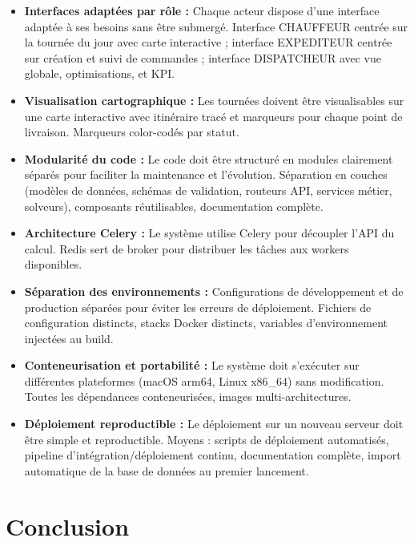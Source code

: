 \documentclass[12pt,a4paper]{report}
\begin{document}
\begin{itemize}[leftmargin=2.2em]
    \item \textbf{Interfaces adaptées par rôle :} Chaque acteur dispose d'une interface adaptée à ses besoins sans être submergé. Interface CHAUFFEUR centrée sur la tournée du jour avec carte interactive ; interface EXPEDITEUR centrée sur création et suivi de commandes ; interface DISPATCHEUR avec vue globale, optimisations, et KPI.

    \item \textbf{Visualisation cartographique :} Les tournées doivent être visualisables sur une carte interactive avec itinéraire tracé et marqueurs pour chaque point de livraison. Marqueurs color-codés par statut.

    \item \textbf{Modularité du code :} Le code doit être structuré en modules clairement séparés pour faciliter la maintenance et l'évolution. Séparation en couches (modèles de données, schémas de validation, routeurs API, services métier, solveurs), composants réutilisables, documentation complète.

    \item \textbf{Architecture Celery :} Le système utilise Celery pour découpler l'API du calcul. Redis sert de broker pour distribuer les tâches aux workers disponibles.

    \item \textbf{Séparation des environnements :} Configurations de développement et de production séparées pour éviter les erreurs de déploiement. Fichiers de configuration distincts, stacks Docker distincts, variables d'environnement injectées au build.

    \item \textbf{Conteneurisation et portabilité :} Le système doit s'exécuter sur différentes plateformes (macOS arm64, Linux x86\_64) sans modification. Toutes les dépendances conteneurisées, images multi-architectures.

    \item \textbf{Déploiement reproductible :} Le déploiement sur un nouveau serveur doit être simple et reproductible. Moyens : scripts de déploiement automatisés, pipeline d'intégration/déploiement continu, documentation complète, import automatique de la base de données au premier lancement.
\end{itemize}

\section{Conclusion}
\end{document}
